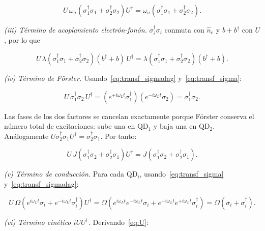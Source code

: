 \documentclass[12pt]{article}
\begin{document}
	\begin{equation}
		U\,\omega_\sigma\!\left(\sigma_1^\dagger\sigma_1 +
		\sigma_2^\dagger\sigma_2\right)U^\dagger
		= \omega_\sigma\!\left(\sigma_1^\dagger\sigma_1 +
		\sigma_2^\dagger\sigma_2\right).
	\end{equation}
	
	\noindent
	\textit{(iii) T\'ermino de acoplamiento electr\'on-fon\'on.}
	$\sigma_i^\dagger\sigma_i$ conmuta con $\hat{n}_e$ y $b+b^\dagger$ con $U$,
	por lo que
	
	\begin{equation}
		U\,\lambda\!\left(\sigma_1^\dagger\sigma_1 +
		\sigma_2^\dagger\sigma_2\right)(b^\dagger + b)\,U^\dagger
		= \lambda\!\left(\sigma_1^\dagger\sigma_1 +
		\sigma_2^\dagger\sigma_2\right)(b^\dagger + b).
	\end{equation}
	
	\noindent
	\textit{(iv) T\'ermino de F\"orster.}
	Usando~\eqref{eq:transf_sigmadag} y~\eqref{eq:transf_sigma}:
	
	\begin{equation}
		U\,\sigma_1^\dagger\sigma_2\,U^\dagger
		= \left(e^{+i\omega_L t}\sigma_1^\dagger\right)
		\!\left(e^{-i\omega_L t}\sigma_2\right)
		= \sigma_1^\dagger\sigma_2.
	\end{equation}
	
	Las fases de los dos factores se cancelan exactamente porque F\"orster conserva
	el n\'umero total de excitaciones: sube una en QD$_1$ y baja una en QD$_2$.
	An\'alogamente $U\sigma_2^\dagger\sigma_1 U^\dagger = \sigma_2^\dagger\sigma_1$.
	Por tanto:
	
	\begin{equation}
		U\,J\!\left(\sigma_1^\dagger\sigma_2 +
		\sigma_2^\dagger\sigma_1\right)U^\dagger
		= J\!\left(\sigma_1^\dagger\sigma_2 + \sigma_2^\dagger\sigma_1\right).
	\end{equation}
	
	\noindent
	\textit{(v) T\'ermino de conducci\'on.}
	Para cada QD$_i$, usando~\eqref{eq:transf_sigma} y~\eqref{eq:transf_sigmadag}:
	
	\begin{equation}
		U\,\Omega\!\left(e^{i\omega_L t}\sigma_i + e^{-i\omega_L t}\sigma_i^\dagger\right)U^\dagger
		= \Omega\!\left(e^{i\omega_L t} e^{-i\omega_L t}\sigma_i
		+ e^{-i\omega_L t} e^{+i\omega_L t}\sigma_i^\dagger\right)
		= \Omega\!\left(\sigma_i + \sigma_i^\dagger\right).
	\end{equation}
	
	\noindent
	\textit{(vi) T\'ermino cin\'etico $i\dot{U}U^\dagger$.}
	Derivando~\eqref{eq:U}:
	
\end{document}
